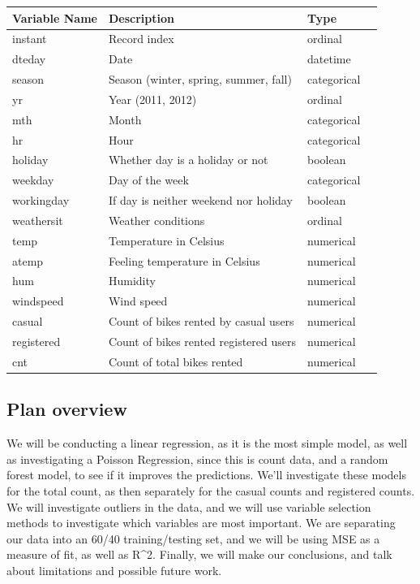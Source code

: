 \documentclass[
]{article}
\begin{document}
\begin{longtable}[]{@{}llll@{}}
\toprule()
Variable Name & Description & Type & \\
\midrule()
\endhead
instant & Record index & ordinal & \\
dteday & Date & datetime & \\
season & Season (winter, spring, summer, fall) & categorical & \\
yr & Year (2011, 2012) & ordinal & \\
mth & Month & categorical & \\
hr & Hour & categorical & \\
holiday & Whether day is a holiday or not & boolean & \\
weekday & Day of the week & categorical & \\
workingday & If day is neither weekend nor holiday & boolean & \\
weathersit & Weather conditions & ordinal & \\
temp & Temperature in Celsius & numerical & \\
atemp & Feeling temperature in Celsius & numerical & \\
hum & Humidity & numerical & \\
windspeed & Wind speed & numerical & \\
casual & Count of bikes rented by casual users & numerical & \\
registered & Count of bikes rented registered users & numerical & \\
cnt & Count of total bikes rented & numerical & \\
\bottomrule()
\end{longtable}

\hypertarget{plan-overview}{%
\subsection{Plan overview}\label{plan-overview}}

We will be conducting a linear regression, as it is the most simple
model, as well as investigating a Poisson Regression, since this is
count data, and a random forest model, to see if it improves the
predictions. We'll investigate these models for the total count, as then
separately for the casual counts and registered counts. We will
investigate outliers in the data, and we will use variable selection
methods to investigate which variables are most important. We are
separating our data into an 60/40 training/testing set, and we will be
using MSE as a measure of fit, as well as R\^{}2. Finally, we will make
our conclusions, and talk about limitations and possible future work.
\end{document}
